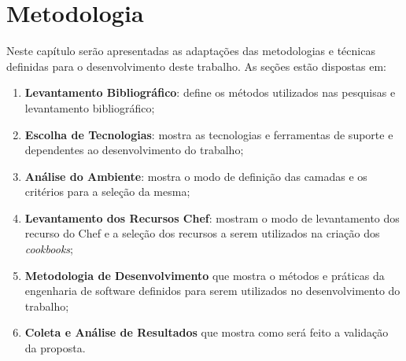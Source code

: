 \newpage\null\thispagestyle{empty}\newpage
\chapter{Metodologia}
\label{chap:metod}

Neste capítulo serão apresentadas as adaptações das metodologias e técnicas
definidas para o desenvolvimento deste trabalho. As seções estão dispostas
em:

\begin{enumerate}
  \item \textbf{Levantamento Bibliográfico}: define os métodos utilizados nas
    pesquisas e levantamento bibliográfico;
  \item \textbf{Escolha de Tecnologias}: mostra as tecnologias e
    ferramentas de suporte e dependentes ao desenvolvimento do trabalho;
  \item \textbf{Análise do Ambiente}: mostra o modo de definição das camadas e os critérios para
    a seleção da mesma;
  \item \textbf{Levantamento dos Recursos Chef}: mostram o modo de levantamento dos recurso do Chef
    e a seleção dos recursos a serem utilizados na criação dos \textit{cookbooks};
  \item \textbf{Metodologia de Desenvolvimento} que mostra o métodos e práticas da engenharia de software
    definidos para serem utilizados no desenvolvimento do trabalho;
  \item \textbf{Coleta e Análise de Resultados} que mostra como será feito a validação da proposta.
\end{enumerate}







